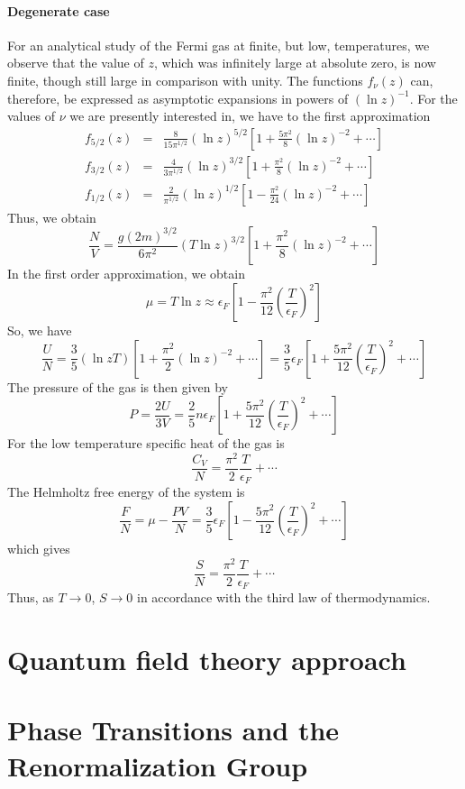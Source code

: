 \subsubsection{Degenerate case}
For an analytical study of the Fermi gas at finite, but low, temperatures, we observe that the value of $z$, which was infinitely large at absolute zero, is now finite, though still large in comparison with unity. 
The functions $f_{\nu}(z)$ can, therefore, be expressed as asymptotic expansions in powers of $(\ln z)^{-1}$.
For the values of $\nu$ we are presently interested in, we have to the first approximation
\begin{eqnarray}
f_{5/2}(z) &=& \frac{8}{15\pi^{1/2}} (\ln z)^{5/2} \left[ 1 + \frac{5\pi^2}{8}(\ln z)^{-2} + \cdots \right] \nonumber \\
f_{3/2}(z) &=& \frac{4}{3\pi^{1/2}} (\ln z)^{3/2} \left[ 1 + \frac{\pi^2}{8}(\ln z)^{-2} + \cdots \right] \nonumber \\
f_{1/2}(z) &=& \frac{2}{\pi^{1/2}} (\ln z)^{1/2} \left[ 1 - \frac{\pi^2}{24}(\ln z)^{-2} + \cdots \right] \nonumber
\end{eqnarray}
Thus, we obtain
\[\frac{N}{V} = \frac{g(2m)^{3/2}}{6\pi^2} (T\ln z)^{3/2} \left[ 1 + \frac{\pi^2}{8}(\ln z)^{-2} + \cdots \right] \]
In the first order approximation, we obtain
\[\mu = T\ln z \approx \epsilon_F \left[ 1 - \frac{\pi^2}{12} \left( \frac{T}{\epsilon_F} \right)^2 \right]\]
So, we have
\[\frac{U}{N} = \frac{3}{5} (\ln z T) \left[ 1 + \frac{\pi^2}{2}(\ln z)^{-2} + \cdots \right] = \frac{3}{5}\epsilon_F \left[ 1 + \frac{5\pi^2}{12}\left( \frac{T}{\epsilon_F} \right)^2 + \cdots \right]\]
The pressure of the gas is then given by
\[P = \frac{2U}{3V} = \frac{2}{5}n\epsilon_F\left[ 1 + \frac{5\pi^2}{12}\left( \frac{T}{\epsilon_F} \right)^2 + \cdots \right] \]
For the low temperature specific heat of the gas is
\[\frac{C_V}{N} = \frac{\pi^2}{2} \frac{T}{\epsilon_F} + \cdots\]
The Helmholtz free energy of the system is
\[\frac{F}{N} = \mu - \frac{PV}{N} = \frac{3}{5}\epsilon_F\left[ 1 - \frac{5\pi^2}{12}\left( \frac{T}{\epsilon_F} \right)^2 + \cdots \right] \]
which gives
\[\frac{S}{N} = \frac{\pi^2}{2}\frac{T}{\epsilon_F} + \cdots\]
Thus, as $T \to 0$, $S \to 0$ in accordance with the third law of thermodynamics.
\chapter{Quantum field theory approach}

\chapter{Phase Transitions and the Renormalization Group}
